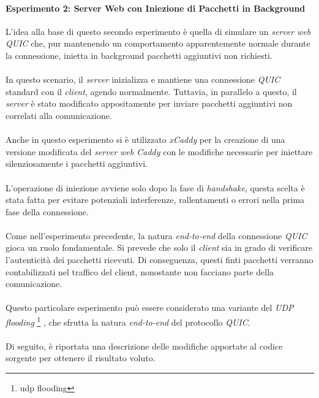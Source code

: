 \paragraph{Esperimento 2: Server Web con Iniezione di Pacchetti in Background}
\label{esperimento2}
\noindent L'idea alla base di questo secondo esperimento è quella di simulare un \emph{server web QUIC} che, 
pur mantenendo un comportamento apparentemente normale durante la connessione, inietta in background pacchetti aggiuntivi non richiesti.
\\\\
In questo scenario, il \emph{server} inizializza e mantiene una connessione \emph{QUIC} standard con il \emph{client}, agendo normalmente. Tuttavia, in parallelo a questo, il \emph{server} è stato modificato appositamente per inviare pacchetti aggiuntivi non correlati alla comunicazione.
\\\\
Anche in questo esperimento si è utilizzato \emph{xCaddy} per la creazione di una versione modificata del \emph{server web Caddy} con le modifiche necessarie per iniettare silenziosamente i pacchetti aggiuntivi.
\\\\
L'operazione di iniezione avviene solo dopo la fase di \emph{handshake}, questa scelta è stata fatta per evitare potenziali interferenze, rallentamenti o errori nella prima fase della connessione. 
\\\\
Come nell'esperimento precedente, la natura \emph{end-to-end} della connessione \emph{QUIC} gioca un ruolo fondamentale. Si prevede che solo il \emph{client} sia in grado di verificare l'autenticità dei pacchetti ricevuti. 
Di conseguenza, questi finti pacchetti verranno contabilizzati nel traffico del client, nonostante non facciano parte della comunicazione.
\\\\
Questo particolare esperimento può essere considerato una variante del \emph{UDP flooding} \footnote{\gls{udp flooding}} \cite{site:udp-flood}, che sfrutta la natura \emph{end-to-end} del protocollo \emph{QUIC}.
\\\\
Di seguito, è riportata una descrizione delle modifiche apportate al codice sorgente per ottenere il risultato voluto.
